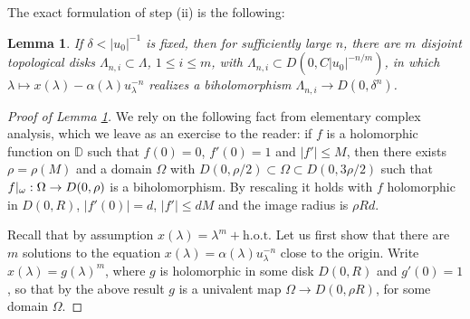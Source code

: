 \documentclass[11pt, oneside]{amsart}
\newcommand{\D}{\mathbb{D}}
\newcommand{\abs}[1]{\left\vert#1\right\vert}
\newcommand{\rest}[1]{ \arrowvert_{#1}}
\newcommand{\hot}{{\mathrm{h.o.t.}}}
\newcommand{\inv}{^{-1}}
\newtheorem{lem}[prop] {Lemma}
\theoremstyle{remark}
\theoremstyle{definition}
\theoremstyle{theorem}
\begin{document}
The exact formulation of step (ii) is the following:
 
\begin{lem}\label{lem:elementary_analysis}
If  $ \delta < \abs{u_0}\inv$   is fixed, then  for 
  sufficiently large $n$,  there are $m$ disjoint topological disks $\Lambda_{n, i}\subset \Lambda$, 
  $1\leq i\leq m$, with $\Lambda_{n, i} \subset D(0, C \abs{u_0}^{-n/m})$, 
  in which 
$\lambda \mapsto x(\lambda ) - \alpha(\lambda) u_\lambda^{-n} $ realizes a 
biholomorphism
$\Lambda_{n, i}\to D(0, \delta^n)$. 
\end{lem}

\begin{proof}[Proof of Lemma \ref{lem:elementary_analysis}] We  rely on the following   fact 
 from elementary  complex analysis, which we leave as an exercise to the reader: if $f$ is a holomorphic function on $\D$ such that $f(0)  = 0$, $f'(0) = 1$ and $\abs{f'}\leq M$, then there exists $\rho= \rho(M)$ 
and a domain $\Omega$ with $D(0, \rho/2)\subset \Omega\subset D(0, 3\rho/2)$ such that $f\rest{\omega}:\Omega\to D(0, \rho)$ is a biholomorphism. By rescaling it holds with $f$ holomorphic in $D(0, R)$, 
$\abs{f'(0)} = d$, $\abs{f'}\leq dM$ and the image radius is $\rho Rd$. 


Recall that by assumption $x(\lambda) = \lambda^m+\hot$
 Let us first show that there are $m$ solutions to the equation $x(\lambda)   = \alpha(\lambda) u_\lambda^{-n}$ close to the origin.
 Write  $x(\lambda) = g(\lambda)^m$, where $g$ is holomorphic in some disk 
$D(0, R)$ and $g'(0) = 1$, so that  by the above result 
$g$ is a univalent  map  $\Omega \to D(0,  \rho R)$, for some domain $\Omega$.


\end{proof}
\end{document}
